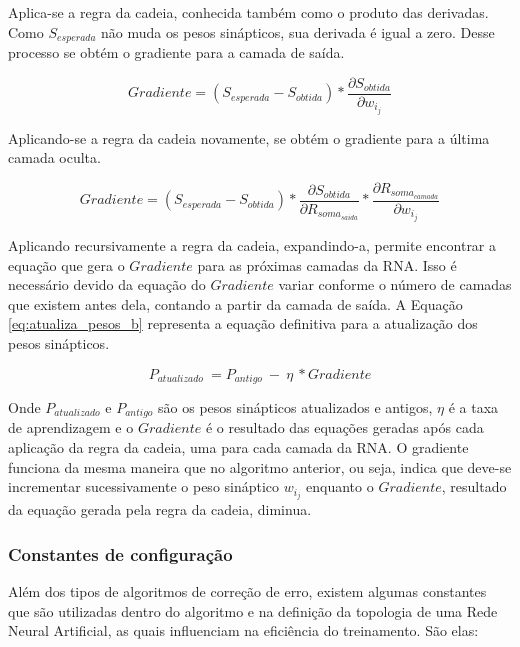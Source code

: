 \documentclass[12pt,oneside,a4paper,chapter=TITLE,section=TITLE,sumario
		=tradicional]{abntex2}
\begin{document}
\begin{lista}
			Aplica-se a regra da cadeia, conhecida também como o produto das derivadas. Como $S_{esperada}$ não muda os pesos sinápticos, sua derivada é igual a zero. Desse processo se obtém o gradiente para a camada de saída.
			
			\begin{equation}
			\label{eq:funcao_minimo4}
			Gradiente = (S_{esperada} - S_{obtida}) * \frac{\partial{S_{obtida}}}{\partial{w_{i_{j}}}}
			\end{equation}
			
			Aplicando-se a regra da cadeia novamente, se obtém o gradiente para a última camada oculta.
			
			\begin{equation}
			\label{eq:funcao_minimo4}
			Gradiente = (S_{esperada} - S_{obtida}) * \frac{\partial{S_{obtida}}}{\partial{R_{soma_{saida}}}} * \frac{\partial{R_{soma_{camada}}}}{\partial{w_{i_{j}}}}
			\end{equation}
			
			Aplicando recursivamente a regra da cadeia, expandindo-a, permite encontrar a equação que gera o $Gradiente$ para as próximas camadas da RNA. Isso é necessário devido da equação do $Gradiente$ variar conforme o número de camadas que existem antes dela, contando a partir da camada de saída. A Equação \ref{eq:atualiza_pesos_b} representa a equação definitiva para a atualização dos pesos sinápticos.
			
			\begin{equation}
			\label{eq:atualiza_pesos_b}
			P_{atualizado}\ = P_{antigo}\ -\ \eta\ * Gradiente
			\end{equation}	
			
			Onde $P_{atualizado}$ e $P_{antigo}$ são os pesos sinápticos atualizados e antigos, $\eta$ é a taxa de aprendizagem e o $Gradiente$ é o resultado das equações geradas após cada aplicação da regra da cadeia, uma para cada camada da RNA. O gradiente funciona da mesma maneira que no algoritmo anterior, ou seja, indica que deve-se incrementar sucessivamente o peso sináptico $w_{i_{j}}$ enquanto o $Gradiente$, resultado da equação gerada pela regra da cadeia, diminua.
			
		\end{lista}
		
		\subsubsection{Constantes de configuração}
		\label{sec:constantes_config}
		Além dos tipos de algoritmos de correção de erro, existem algumas constantes que são utilizadas dentro do algoritmo e na definição da topologia de uma Rede Neural Artificial, as quais influenciam na eficiência do treinamento. São elas:
		
\end{document}
